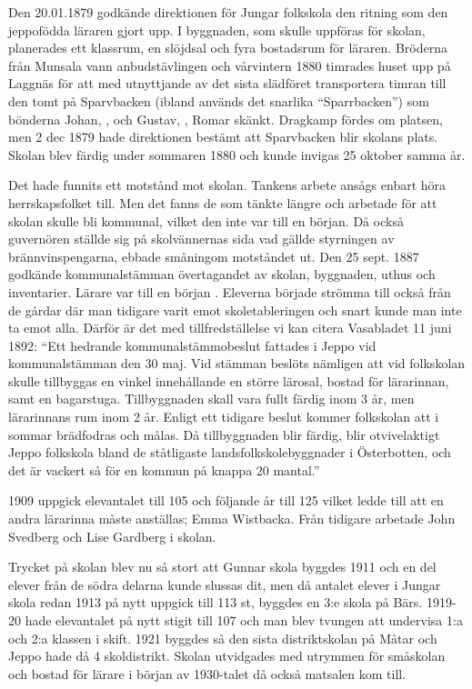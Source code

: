 
Den 20.01.1879 godkände direktionen för Jungar folkskola den ritning som den jeppofödda läraren  gjort upp. I byggnaden, som skulle uppföras för skolan, planerades ett klassrum, en slöjdsal och fyra bostadsrum för läraren. Bröderna  från Munsala vann anbudstävlingen och vårvintern 1880 timrades huset upp på Laggnäs för att med utnyttjande av det sista slädföret transportera timran till den tomt på Sparvbacken (ibland används det snarlika ``Sparrbacken'') som bönderna Johan, , och Gustav, , Romar skänkt. Dragkamp fördes om platsen, men 2 dec 1879 hade direktionen bestämt att Sparvbacken blir skolans plats. Skolan blev färdig under sommaren 1880 och kunde invigas 25 oktober samma år.

Det hade funnits ett motstånd mot skolan. Tankens arbete ansågs enbart höra herrskapsfolket till. Men det fanns de som tänkte längre och arbetade för att skolan skulle bli kommunal, vilket den inte var till en början. Då också guvernören ställde sig på skolvännernas sida vad gällde styrningen av brännvinspengarna, ebbade småningom motståndet ut. Den 25 sept. 1887 godkände kommunalstämman övertagandet av skolan, byggnaden, uthus och inventarier. Lärare var till en början . Eleverna började strömma till också från de gårdar där man tidigare varit emot skoletableringen och snart kunde man inte ta emot alla. Därför är det  med tillfredställelse vi kan citera Vasabladet 11 juni 1892: ``Ett hedrande kommunalstämmobeslut fattades i Jeppo vid kommunalstämman den 30 maj. Vid stämman beslöts nämligen att vid folkskolan skulle tillbyggas en vinkel innehållande en större lärosal, bostad för lärarinnan, samt en bagarstuga. Tillbyggnaden skall vara fullt färdig inom 3 år, men lärarinnans rum inom 2 år. Enligt ett tidigare beslut kommer folkskolan att i sommar brädfodras och målas. Då tillbyggnaden blir färdig, blir otvivelaktigt Jeppo folkskola bland de ståtligaste landsfolkskolebyggnader i Österbotten, och det är vackert så för en kommun på knappa 20 mantal.''

1909 uppgick elevantalet till 105 och följande år till 125 vilket ledde till att en andra lärarinna måste anställas; Emma Wistbacka. Från
tidigare arbetade John Svedberg och Lise Gardberg i skolan.

Trycket på skolan blev nu så stort att Gunnar skola byggdes 1911 och en del elever från de södra delarna kunde slussas dit, men då antalet elever i Jungar skola redan 1913 på nytt uppgick till 113 st, byggdes en 3:e skola på Bärs. 1919-20 hade elevantalet på nytt stigit till 107 och man blev tvungen att undervisa 1:a och 2:a klassen i skift. 1921 byggdes så den sista distriktskolan på Måtar och Jeppo hade då 4  skoldistrikt. Skolan utvidgades med utrymmen för småskolan och bostad för lärare i början av 1930-talet då också matsalen kom till.

